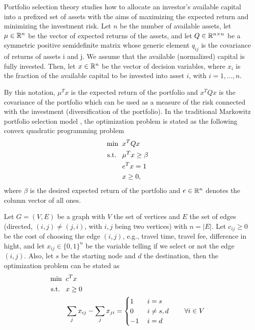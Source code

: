 \documentclass[10pt,a4paper]{article}
\begin{document}
\begin{example} Portfolio selection theory studies how to allocate an investor’s available capital into a prefixed set of assets with the aims of maximizing the expected return and minimizing the investment risk. Let $n$ be the number of available assets, let $\mu\in \mathbb{R}^n$ be the vector of expected returns of the assets, and let $Q \in \mathbb{R}^{n\times n}$ be a symmetric positive semidefinite matrix whose generic element $q_{ij}$ is the covariance of returns of assets i and j. We assume that the available (normalized) capital is fully invested. Then, let $x \in \mathbb{R}^n$ be the vector of decision variables, where $x_i$ is the fraction of the available capital to be invested into asset $i$, with $i = 1, \dots, n$. 
\par By this notation, $\mu^T x$ is the expected return of the portfolio and $x^TQx$ is the covariance of the portfolio which
can be used as a measure of the risk connected with the investment (diversification of the portfolio). 
In the traditional Markowitz portfolio selection model \cite{markowits52a}, the optimization problem is stated as the
following convex quadratic programming problem
\begin{equation*}
	\begin{split}
		\min \;\; &x^TQx\\
		\text{s.t.} \;\;\;& \mu^Tx\geq \beta \\
		& e^Tx =1\\
		& x\geq 0,
	\end{split}
\end{equation*}
where $\beta$ is the desired expected return of the portfolio and $e\in \mathbb{R}^n$ denotes the column vector of all ones.
\end{example}
\begin{example} Let $G=(V,E)$ be a graph with $V$ the set of vertices and $E$ the set of edges (directed, $(i,j)\neq(j,i)$, with $i,j$ being two vertices) with $n=|E|$. Let $c_{ij}\geq0$ be the cost of choosing the edge $(i,j)$, e.g., travel time, travel fee, difference in hight, and let $x_{ij}\in \{0,1\}^{n}$ be the variable telling if we select or not the edge $(i,j)$. Also, let $s$ be the starting node and $d$ the destination, then the optimization problem can be stated as
\begin{equation*}
	\begin{split}
		\min \;\; &c^Tx\\
		\text{s.t.} \;\;\;& x\geq 0\\
		& \sum_{j} x_{ij} - \sum_{j} x_{ji} = \begin{cases}1 \quad & i=s\\
			0 & i\neq s,d\\
			-1 & i=d
		\end{cases} \qquad \forall i \in V
	\end{split}
\end{equation*}
\end{example}
\end{document}
